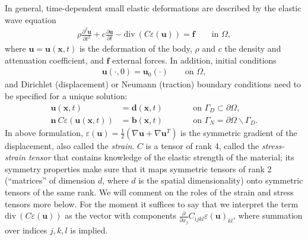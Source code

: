 \documentclass{article}
\renewcommand{\vec}[1]{\mathbf{#1}}
\renewcommand{\div}{\mathrm{div}\ }
\begin{document}
In general, time-dependent small elastic deformations are described by the
elastic wave equation
\begin{gather}
  \rho \frac{\partial^2 \vec u}{\partial t^2} 
  + c \frac{\partial \vec u}{\partial t}
  - \div ( C \varepsilon(\vec u)) = \vec f
  \qquad
  \text{in $\Omega$},
\end{gather}
where $\vec u=\vec u (\vec x,t)$ is the deformation of the body, $\rho$
and $c$ the density and attenuation coefficient, and $\vec f$ external forces.
In addition, initial conditions
\begin{align}
  \vec u(\cdot, 0) = \vec u_0(\cdot)
  \qquad
  \text{on $\Omega$},
\end{align}
and Dirichlet (displacement) or Neumann (traction) boundary conditions need
to be specified for a unique solution:
\begin{align}
  \vec u(\vec x,t) &= \vec d(\vec x,t)
  \qquad
  &&\text{on $\Gamma_D\subset\partial\Omega$},  
  \\
  \vec n \ C \varepsilon(\vec u(\vec x,t)) &= \vec b(\vec x,t)
  \qquad
  &&\text{on $\Gamma_N=\partial\Omega\backslash\Gamma_D$}.
\end{align}
In above formulation, $\varepsilon(\vec u)= \tfrac 12 (\nabla \vec u + \nabla
\vec u^T)$ is the symmetric gradient of the displacement, also called the
\textit{strain}. $C$ is a tensor of rank 4, called the \textit{stress-strain
  tensor} that contains knowledge of the elastic strength of the material; its
symmetry properties make sure that it maps symmetric tensors of rank 2
(``matrices'' of dimension $d$, where $d$ is the spatial dimensionality) onto
symmetric tensors of the same rank. We will comment on the roles of the strain
and stress tensors more below. For the moment it suffices to say that we
interpret the term $\div ( C \varepsilon(\vec u))$ as the vector with
components $\tfrac \partial{\partial x_j} C_{ijkl} \varepsilon(\vec u)_{kl}$,
where summation over indices $j,k,l$ is implied.
\end{document}
